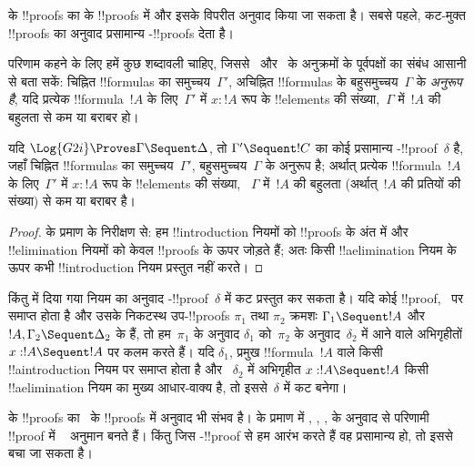\documentclass[../../../include/open-logic-section]{subfiles}
\begin{document}


 के !!{proof}s का  के !!{proof}s में और इसके विपरीत अनुवाद
किया जा सकता है। सबसे पहले, कट-मुक्त  !!{proof}s का अनुवाद प्रसामान्य
-!!{proof}s देता है।

परिणाम कहने के लिए हमें कुछ शब्दावली चाहिए, जिससे~ और~ के
अनुक्रमों के पूर्वपक्षों का संबंध आसानी से बता सकें: चिह्नित !!{formula}s का
समुच्चय~$\Gamma'$, अचिह्नित !!{formula}s के बहुसमुच्चय~$\Gamma$ के
\emph{अनुरूप है}, यदि प्रत्येक !!{formula}~$!A$ के लिए~$\Gamma'$ में $x :
!A$ रूप के !!{element}s की संख्या,~$\Gamma$ में~$!A$ की बहुलता से कम या बराबर
हो।

\begin{cor}
यदि $\Log{G2i} \Proves \Gamma \Sequent \Delta$, तो $\Gamma' \Sequent !C$ का
कोई प्रसामान्य -!!{proof}~$\delta$ है, जहाँ चिह्नित !!{formula}s का
समुच्चय~$\Gamma'$, बहुसमुच्चय~$\Gamma$ के अनुरूप है; अर्थात् प्रत्येक
!!{formula}~$!A$ के लिए~$\Gamma'$ में $x : !A$ रूप के !!{element}s की संख्या,
~$\Gamma$ में~$!A$ की बहुलता (अर्थात्~$!A$ की प्रतियों की संख्या) से कम या
बराबर है।
\end{cor}

\begin{proof}
 के प्रमाण के निरीक्षण से: हम
!!{introduction} नियमों को !!{proof}s के अंत में और !!{elimination} नियमों को
केवल !!{proof}s के ऊपर जोड़ते हैं; अतः किसी !!a{elimination} नियम के ऊपर कभी
!!{introduction} नियम प्रस्तुत नहीं करते।
\end{proof}

किंतु  में दिया गया \Cut{} नियम का अनुवाद
-!!{proof}~$\delta$ में कट प्रस्तुत कर सकता है। यदि कोई 
!!{proof},~\Cut{} पर समाप्त होता है और उसके निकटस्थ उप-!!{proof}s $\pi_1$ तथा
$\pi_2$ क्रमशः $\Gamma_1 \Sequent !A$ और $!A, \Gamma_2 \Sequent \Delta_2$
के हैं, तो हम~$\pi_1$ के अनुवाद $\delta_1$ को~$\pi_2$ के अनुवाद~$\delta_2$
में आने वाले अभिगृहीतों $x:!A \Sequent !A$ पर कलम करते हैं। यदि $\delta_1$,
प्रमुख !!{formula}~$!A$ वाले किसी !!a{introduction} नियम पर समाप्त होता है और
~$\delta_2$ में अभिगृहीत $x:!A \Sequent !A$ किसी !!a{elimination} नियम का
मुख्य आधार-वाक्य है, तो इससे~$\delta$ में कट बनेगा।

 के !!{proof}s का~ के !!{proof}s में अनुवाद भी संभव है।
 के प्रमाण में \Elim{\land}, \Elim{\lif},
\Elim{\lnot}, \Elim{\lforall} के अनुवाद से परिणामी  !!{proof} में
~\Cut{} अनुमान बनते हैं। किंतु जिस -!!{proof} से हम आरंभ करते हैं वह
प्रसामान्य हो, तो इससे बचा जा सकता है।
\end{document}
